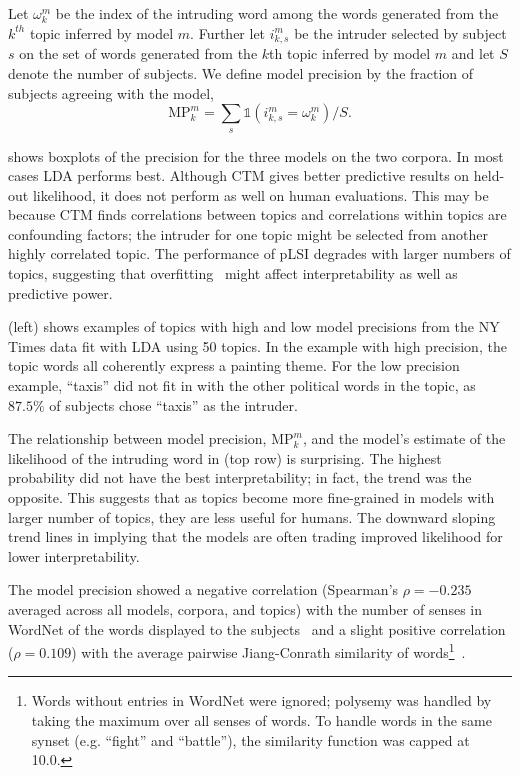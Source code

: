 Let $\omega^{m}_{k}$ be the index of the intruding word among the words generated
from the $k^{th}$ topic inferred by model $m$.  Further let $i^m_{k, s}$ be
the intruder selected by subject $s$ on the set of words generated from the
$k$th topic inferred by model $m$ and let $S$ denote the number of subjects.  We
define model precision by the fraction of subjects agreeing with the model,
\begin{equation}
  \mathrm{MP}^m_k = \textstyle \sum_{s} \mathds{1}(i^m_{k,s} = \omega^{m}_{k}) / S.
  \label{eq:mp}
\end{equation}


 shows boxplots of the precision for the three
models on the two corpora.  In most cases LDA performs best. Although
CTM gives better predictive results on held-out likelihood, it does
not perform as well on human evaluations. This may be because CTM
finds correlations between topics and correlations within topics are
confounding factors; the intruder for one topic might be selected from
another highly correlated topic.  The performance of pLSI degrades
with larger numbers of topics, suggesting that
overfitting~\cite{blei-03} might affect interpretability as well as
predictive power.

 (left) shows examples of topics with high
and low model precisions from the NY Times data fit with LDA using 50
topics. In the example with high precision, the topic words all
coherently express a painting theme.  For the low precision example,
 ``taxis'' did not fit in with the other
political words in the topic, as $87.5\%$ of subjects chose ``taxis''
as the intruder.


The relationship between model precision, $\mathrm{MP}^m_k$, and the
model's estimate of the likelihood of the intruding word in
 (top row) is surprising.  The highest
probability did not have the best interpretability; in fact, the trend
was the opposite.  This suggests that as topics become more
fine-grained in models with larger number of topics, they are less
useful for humans.  The downward sloping trend lines in
 implying that the models are often trading
improved likelihood for lower interpretability.


The model precision showed a negative correlation (Spearman's $\rho =
-0.235$ averaged across all models, corpora, and topics) with the
number of senses in WordNet of the words displayed to the
subjects~\cite{Miller90} and a slight positive correlation ($\rho =
0.109$) with the average pairwise Jiang-Conrath similarity of
words\footnote{Words without entries in WordNet were ignored; polysemy
  was handled by taking the maximum over all senses of words.  To
  handle words in the same synset (e.g. ``fight'' and ``battle''), the
  similarity function was capped at 10.0.}~\cite{jiang-97}.  

